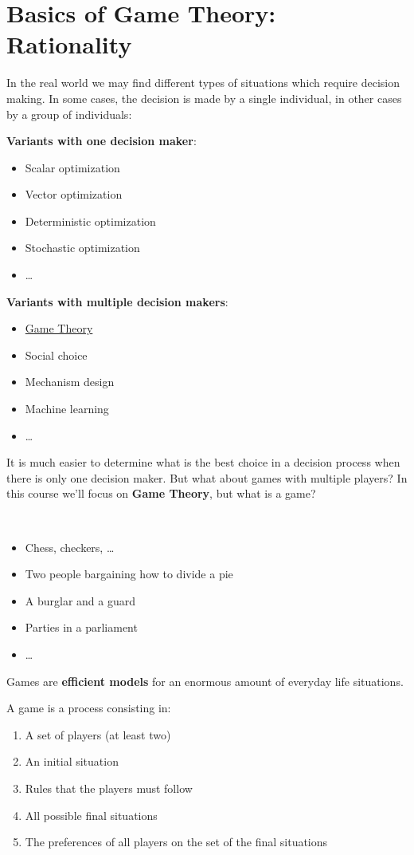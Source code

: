\documentclass[../main.tex]{subfiles}
\begin{document}
\chapter{Basics of Game Theory: Rationality}
In the real world we may find different types of situations which require decision making. In some cases, the decision is made by a single individual, in other cases by a group of individuals:

\textbf{Variants with one decision maker}:
\begin{itemize}
    \item Scalar optimization
    \item Vector optimization
    \item Deterministic optimization
    \item Stochastic optimization
    \item \ldots
\end{itemize}

\textbf{Variants with multiple decision makers}:
\begin{itemize}
    \item \underline{Game Theory}
    \item Social choice
    \item Mechanism design
    \item Machine learning
    \item \ldots
\end{itemize}
It is much easier to determine what is the best choice in a decision process when there is only one decision maker. But what about games with multiple players? In this course we'll focus on \textbf{Game Theory}, but what is a game?

\begin{example}\
    \begin{itemize}
        \item Chess, checkers, \ldots
        \item Two people bargaining how to divide a pie
        \item A burglar and a guard
        \item Parties in a parliament
        \item \ldots
    \end{itemize}
\end{example}

Games are \textbf{efficient models} for an enormous amount of everyday life situations.

A game is a process consisting in:
\begin{enumerate}
    \item A set of players (at least two)
    \item An initial situation
    \item Rules that the players must follow
    \item All possible final situations
    \item The preferences of all players on the set of the final situations
\end{enumerate}
\end{document}
